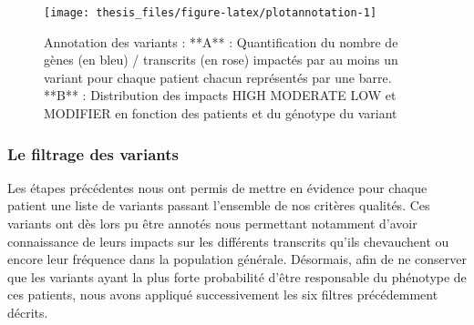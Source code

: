 \documentclass[12pt,twoside]{reedthesis}
\theoremstyle{definition}
\theoremstyle{definition}
\theoremstyle{remark}
\begin{document}
  \newpage
  
  \begin{figure}
  
  {\centering \texttt{[image: thesis\_files/figure-latex/plotannotation-1]} 
  
  }
  
  \caption[Annotation des variants]{Annotation des variants : **A** : Quantification du nombre de gènes (en bleu) / transcrits (en rose) impactés par au moins un variant pour chaque patient chacun représentés par une barre. **B** : Distribution des impacts HIGH MODERATE LOW et MODIFIER en fonction des patients et du génotype du variant}\label{fig:plotannotation}
  \end{figure}
  
  \subsubsection{Le filtrage des
  variants}\label{le-filtrage-des-variants-1}
  
  Les étapes précédentes nous ont permis de mettre en évidence pour chaque
  patient une liste de variants passant l'ensemble de nos critères
  qualités. Ces variants ont dès lors pu être annotés nous permettant
  notamment d'avoir connaissance de leurs impacts sur les différents
  transcrits qu'ils chevauchent ou encore leur fréquence dans la
  population générale. Désormais, afin de ne conserver que les variants
  ayant la plus forte probabilité d'être responsable du phénotype de ces
  patients, nous avons appliqué successivement les six filtres
  précédemment décrits.
  
\end{document}
